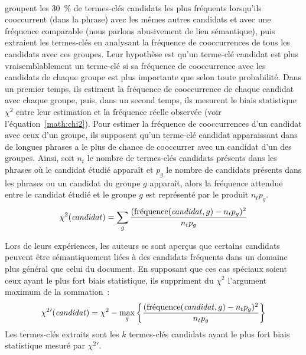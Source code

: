         ~\\ groupent les 30~\% de termes-clés
        candidats les plus fréquents lorsqu'ils cooccurrent (dans la phrase) avec les
        mêmes autres candidats et avec une fréquence comparable (nous parlons
        abusivement de lien sémantique), puis extraient les ter\-mes-clés en
        analysant la fréquence de cooccurrences de tous les candidats avec ces groupes.
        Leur hypothèse est qu'un terme-clé candidat est plus vraisemblablement un
        terme-clé si sa fréquence de cooccurrence avec les candidats de chaque
        groupe est plus importante que selon toute probabilité. Dans un premier
        temps, ils estiment la fréquence de cooccurrence de chaque candidat avec
        chaque groupe, puis, dans un second temps, ils mesurent le biais
        statistique $\chi^2$ entre leur estimation et la fréquence réelle
        observée (voir l'équation~\ref{math:chi2}). Pour estimer la fréquence de
        cooccurrences d'un candidat avec ceux d'un groupe, ils supposent qu'un
        terme-clé candidat apparaissant dans de longues phrases a le plus de
        chance de cooccurrer avec un candidat d'un des groupes. Ainsi, soit
        $n_t$ le nombre de termes-clés candidats présents dans les phrases où le
        candidat étudié apparaît et $p_g$ le nombre de candidats présents dans
        les phrases ou un candidat du groupe $g$ apparaît, alors la fréquence
        attendue entre le candidat étudié et le groupe $g$ est représenté par le
        produit $n_tp_g$.
        \begin{align}
          \chi^2(\text{\textit{candidat}}) = \sum_{g} \frac{(\text{fréquence}(\text{\textit{candidat}}, g) - n_tp_g)^2}{n_tp_g} \label{math:chi2}
        \end{align}
        
        Lors de leurs expériences, les auteurs se sont aperçus que certains
        candidats peuvent être sémantiquement liées à des candidats fréquents
        dans un domaine plus général que celui du document. En supposant que ces
        cas spéciaux soient ceux ayant le plus fort biais statistique, ils
        suppriment du $\chi^2$ l'argument maximum de la sommation~:
        \begin{align}
          \chi^2{'}(\text{\textit{candidat}}) = \chi^2 - \max_{g}\left\{\frac{(\text{fréquence}(\text{\textit{candidat}}, g) - n_tp_g)^2}{n_tp_g}\right\}
        \end{align}
        Les termes-clés extraits sont les $k$ termes-clés candidats ayant le
        plus fort biais statistique mesuré par $\chi^2{'}$.

